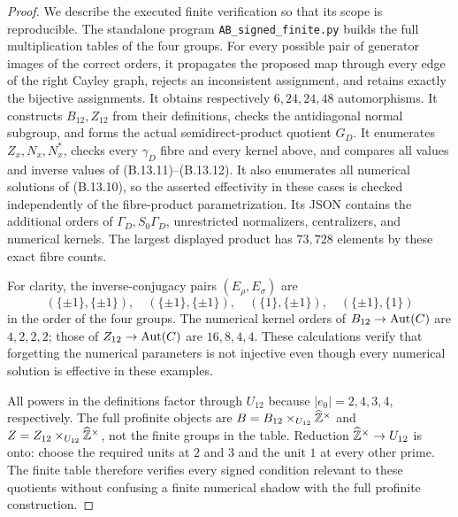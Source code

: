\begin{proof}
We describe the executed finite verification so that its scope is
reproducible. The standalone program \texttt{AB\_signed\_finite.py}
builds the full multiplication tables of the four groups. For every
possible pair of generator images of the correct orders, it
propagates the proposed map through every edge of the right Cayley
graph, rejects an inconsistent assignment, and retains exactly the
bijective assignments. It obtains respectively $6,24,24,48$
automorphisms. It constructs $B_{12},Z_{12}$ from their definitions,
checks the antidiagonal normal subgroup, and forms the actual
semidirect-product quotient $G_D$. It enumerates $Z_x,N_x,N_x^*$,
checks every $\gamma_D$ fibre and every kernel above, and compares
all values and inverse values of (B.13.11)--(B.13.12). It also
enumerates all numerical solutions of (B.13.10), so the asserted
effectivity in these cases is checked independently of the
fibre-product parametrization. Its JSON contains the additional
orders of $\Gamma_D,S_0\Gamma_D$, unrestricted normalizers,
centralizers, and numerical kernels. The largest displayed product
has $73{,}728$ elements by these exact fibre counts.

For clarity, the inverse-conjugacy pairs $(E_\rho,E_\sigma)$ are
\[
 (\{\pm1\},\{\pm1\}),\quad
 (\{\pm1\},\{\pm1\}),\quad
 (\{1\},\{\pm1\}),\quad
 (\{\pm1\},\{1\})
\]
in the order of the four groups. The numerical kernel orders of
$B_{12}\to\operatorname{Aut}(C)$ are $4,2,2,2$; those of
$Z_{12}\to\operatorname{Aut}(C)$ are $16,8,4,4$. These calculations verify that
forgetting the numerical parameters is not injective even though
every numerical solution is effective in these examples.

All powers in the definitions factor through $U_{12}$ because
$|e_0|=2,4,3,4$, respectively. The full profinite objects are
$B=B_{12}\times_{U_{12}}\widehat{\mathbb Z}^\times$ and
$Z=Z_{12}\times_{U_{12}}\widehat{\mathbb Z}^\times$, not the finite groups
in the table. Reduction $\widehat{\mathbb Z}^\times\to U_{12}$ is onto:
choose the required units at $2$ and $3$ and the unit $1$ at every
other prime. The finite table therefore verifies every signed
condition relevant to these quotients without confusing a finite
numerical shadow with the full profinite construction.
\end{proof}
